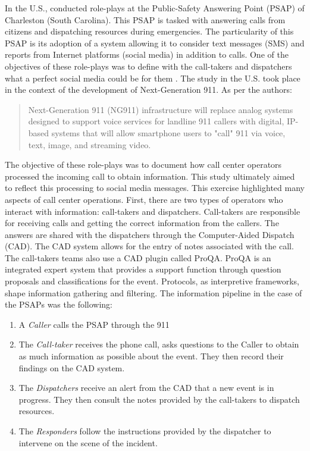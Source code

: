 In the U.S., \textcite{graceRolePlayingNext2019} conducted role-plays at the Public-Safety Answering Point (PSAP) of Charleston (South Carolina).
This PSAP is tasked with answering calls from citizens and dispatching resources during emergencies.
The particularity of this PSAP is its adoption of a system allowing it to consider text messages (SMS) and reports from Internet platforms (social media) in addition to calls.
One of the objectives of these role-plays was to define with the call-takers and dispatchers what a perfect social media could be for them \parencite{kropczynskiIdentifyingActionableInformation2018}.
The study in the U.S. took place in the context of the development of Next-Generation 911.
As per the authors:
\blockquote{Next-Generation 911 (NG911) infrastructure will replace analog systems designed to support voice services for landline 911 callers with digital, IP-based systems that will allow smartphone users to "call" 911 via voice, text, image, and streaming video.}
The objective of these role-plays was to document how call center operators processed the incoming call to obtain information.
This study ultimately aimed to reflect this processing to social media messages.
This exercise highlighted many aspects of call center operations.
First, there are two types of operators who interact with information: call-takers and dispatchers.
Call-takers are responsible for receiving calls and getting the correct information from the callers.
The answers are shared with the dispatchers through the Computer-Aided Dispatch (CAD).
The CAD system allows for the entry of notes associated with the call.
The call-takers teams also use a CAD plugin called ProQA.
ProQA is an integrated expert system that provides a support function through question proposals and classifications for the event.
Protocols, as interpretive frameworks, shape information gathering and filtering.
The information pipeline in the case of the PSAPs was the following:

\begin{enumerate}
    \item A \textit{Caller} calls the PSAP through the 911
    \item The \textit{Call-taker} receives the phone call, asks questions to the Caller to obtain as much information as possible about the event.
          They then record their findings on the CAD system.
    \item The \textit{Dispatchers} receive an alert from the CAD that a new event is in progress. They then consult the notes provided by the call-takers to dispatch resources.
    \item The \textit{Responders} follow the instructions provided by the dispatcher to intervene on the scene of the incident.
\end{enumerate}

